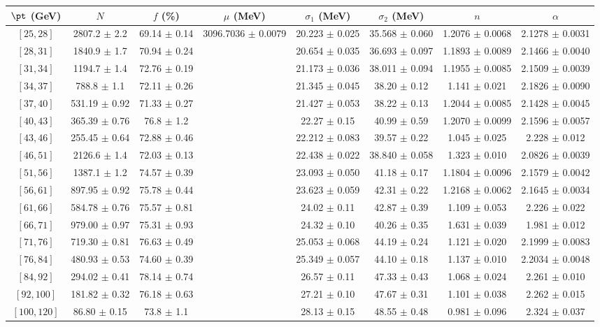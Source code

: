 \begin{tabular}{c||c|c|c|c|c|c|c}
$\pt$ (GeV) & $N$ & $f$ (\%) & $\mu$ (MeV) & $\sigma_1$ (MeV) & $\sigma_2$ (MeV) & $n$ & $\alpha$ \\
\hline
$[25, 28]$ & 2807.2 $\pm$ 2.2 & 69.14 $\pm$ 0.14 & \multirow{17}{*}{3096.7036 $\pm$ 0.0079} & 20.223 $\pm$ 0.025 & 35.568 $\pm$ 0.060 & 1.2076 $\pm$ 0.0068 & 2.1278 $\pm$ 0.0031\\
$[28, 31]$ & 1840.9 $\pm$ 1.7 & 70.94 $\pm$ 0.24 &  & 20.654 $\pm$ 0.035 & 36.693 $\pm$ 0.097 & 1.1893 $\pm$ 0.0089 & 2.1466 $\pm$ 0.0040\\
$[31, 34]$ & 1194.7 $\pm$ 1.4 & 72.76 $\pm$ 0.19 &  & 21.173 $\pm$ 0.036 & 38.011 $\pm$ 0.094 & 1.1955 $\pm$ 0.0085 & 2.1509 $\pm$ 0.0039\\
$[34, 37]$ & 788.8 $\pm$ 1.1 & 72.11 $\pm$ 0.26 &  & 21.345 $\pm$ 0.045 & 38.20 $\pm$ 0.12 & 1.141 $\pm$ 0.021 & 2.1826 $\pm$ 0.0090\\
$[37, 40]$ & 531.19 $\pm$ 0.92 & 71.33 $\pm$ 0.27 &  & 21.427 $\pm$ 0.053 & 38.22 $\pm$ 0.13 & 1.2044 $\pm$ 0.0085 & 2.1428 $\pm$ 0.0045\\
$[40, 43]$ & 365.39 $\pm$ 0.76 & 76.8 $\pm$ 1.2 &  & 22.27 $\pm$ 0.15 & 40.99 $\pm$ 0.59 & 1.2070 $\pm$ 0.0099 & 2.1596 $\pm$ 0.0057\\
$[43, 46]$ & 255.45 $\pm$ 0.64 & 72.88 $\pm$ 0.46 &  & 22.212 $\pm$ 0.083 & 39.57 $\pm$ 0.22 & 1.045 $\pm$ 0.025 & 2.228 $\pm$ 0.012\\
$[46, 51]$ & 2126.6 $\pm$ 1.4 & 72.03 $\pm$ 0.13 &  & 22.438 $\pm$ 0.022 & 38.840 $\pm$ 0.058 & 1.323 $\pm$ 0.010 & 2.0826 $\pm$ 0.0039\\
$[51, 56]$ & 1387.1 $\pm$ 1.2 & 74.57 $\pm$ 0.39 &  & 23.093 $\pm$ 0.050 & 41.18 $\pm$ 0.17 & 1.1804 $\pm$ 0.0096 & 2.1579 $\pm$ 0.0042\\
$[56, 61]$ & 897.95 $\pm$ 0.92 & 75.78 $\pm$ 0.44 &  & 23.623 $\pm$ 0.059 & 42.31 $\pm$ 0.22 & 1.2168 $\pm$ 0.0062 & 2.1645 $\pm$ 0.0034\\
$[61, 66]$ & 584.78 $\pm$ 0.76 & 75.57 $\pm$ 0.81 &  & 24.02 $\pm$ 0.11 & 42.87 $\pm$ 0.39 & 1.109 $\pm$ 0.053 & 2.226 $\pm$ 0.022\\
$[66, 71]$ & 979.00 $\pm$ 0.97 & 75.31 $\pm$ 0.93 &  & 24.32 $\pm$ 0.10 & 40.26 $\pm$ 0.35 & 1.631 $\pm$ 0.039 & 1.981 $\pm$ 0.012\\
$[71, 76]$ & 719.30 $\pm$ 0.81 & 76.63 $\pm$ 0.49 &  & 25.053 $\pm$ 0.068 & 44.19 $\pm$ 0.24 & 1.121 $\pm$ 0.020 & 2.1999 $\pm$ 0.0083\\
$[76, 84]$ & 480.93 $\pm$ 0.53 & 74.60 $\pm$ 0.39 &  & 25.349 $\pm$ 0.057 & 44.10 $\pm$ 0.18 & 1.137 $\pm$ 0.010 & 2.2034 $\pm$ 0.0048\\
$[84, 92]$ & 294.02 $\pm$ 0.41 & 78.14 $\pm$ 0.74 &  & 26.57 $\pm$ 0.11 & 47.33 $\pm$ 0.43 & 1.068 $\pm$ 0.024 & 2.261 $\pm$ 0.010\\
$[92, 100]$ & 181.82 $\pm$ 0.32 & 76.18 $\pm$ 0.63 &  & 27.21 $\pm$ 0.10 & 47.67 $\pm$ 0.31 & 1.101 $\pm$ 0.038 & 2.262 $\pm$ 0.015\\
$[100, 120]$ & 86.80 $\pm$ 0.15 & 73.8 $\pm$ 1.1 &  & 28.13 $\pm$ 0.15 & 48.55 $\pm$ 0.48 & 0.981 $\pm$ 0.096 & 2.324 $\pm$ 0.037\\
\end{tabular}

